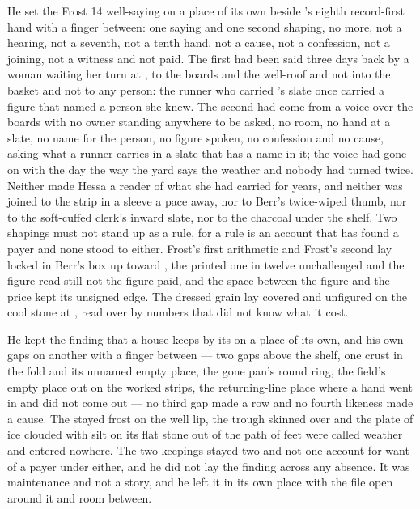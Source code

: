 He set the Frost 14 well-saying on a place of its own beside 's eighth record-first hand with a finger between: one saying and one second shaping, no more, not a hearing, not a seventh, not a tenth hand, not a cause, not a confession, not a joining, not a witness and not paid. The first had been said three days back by a woman waiting her turn at , to the boards and the well-roof and not into the basket and not to any person: the runner who carried 's slate once carried a figure that named a person she knew. The second had come from a voice over the boards with no owner standing anywhere to be asked, no room, no hand at a slate, no name for the person, no figure spoken, no confession and no cause, asking what a runner carries in a slate that has a name in it; the voice had gone on with the day the way the yard says the weather and nobody had turned twice. Neither made Hessa a reader of what she had carried for years, and neither was joined to the strip in a sleeve a pace away, nor to Berr's twice-wiped thumb, nor to the soft-cuffed clerk's inward slate, nor to the charcoal under the shelf. Two shapings must not stand up as a rule, for a rule is an account that has found a payer and none stood to either. Frost's first arithmetic and Frost's second lay locked in Berr's box up  toward , the printed one in twelve unchallenged and the figure read still not the figure paid, and the space between the figure and the price kept its unsigned edge. The dressed grain lay covered and unfigured on the cool stone at , read over by numbers that did not know what it cost.

He kept the finding that a house keeps by its  on a place of its own, and his own gaps on another with a finger between --- two gaps above the shelf, one crust in the fold and its unnamed empty place, the gone pan's round ring, the field's empty place out on the worked strips, the returning-line place where a hand went in and did not come out --- no third gap made a row and no fourth likeness made a cause. The stayed frost on the well lip, the trough skinned over and the plate of ice clouded with silt on its flat stone out of the path of feet were called weather and entered nowhere. The two keepings stayed two and not one account for want of a payer under either, and he did not lay the finding across any absence. It was maintenance and not a story, and he left it in its own place with the file open around it and room between.


